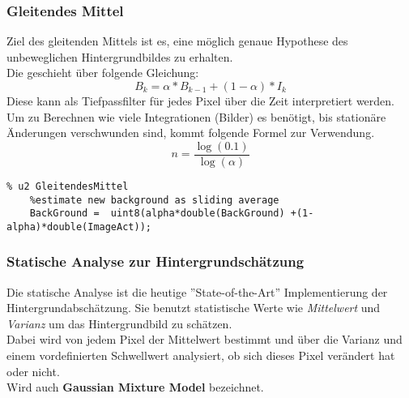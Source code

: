 \subsubsection{Gleitendes Mittel}
Ziel des gleitenden Mittels ist es, eine möglich genaue Hypothese des unbeweglichen Hintergrundbildes zu erhalten.\\
Die geschieht über folgende Gleichung:
\begin{equation}
    B_k = \alpha * B_{k-1} + (1-\alpha) * I_k
\end{equation}
Diese kann als Tiefpassfilter für jedes Pixel über die Zeit interpretiert werden.\\
Um zu Berechnen wie viele Integrationen (Bilder) es benötigt, bis stationäre Änderungen verschwunden sind, kommt folgende Formel zur Verwendung.
\begin{equation}
    n=\frac{\log(0.1)}{\log(\alpha)}
\end{equation}
\begin{lstlisting}
% u2 GleitendesMittel
    %estimate new background as sliding average
    BackGround =  uint8(alpha*double(BackGround) +(1-alpha)*double(ImageAct));
\end{lstlisting}
\subsubsection{Statische Analyse zur Hintergrundschätzung}
Die statische Analyse ist die heutige ''State-of-the-Art'' Implementierung der Hintergrundabschätzung. Sie benutzt statistische Werte wie \textit{Mittelwert} und \textit{Varianz} um das Hintergrundbild zu schätzen.\\
Dabei wird von jedem Pixel der Mittelwert bestimmt und über die Varianz und einem vordefinierten Schwellwert analysiert, ob sich dieses Pixel verändert hat oder nicht.\\
Wird auch \textbf{Gaussian Mixture Model} bezeichnet.